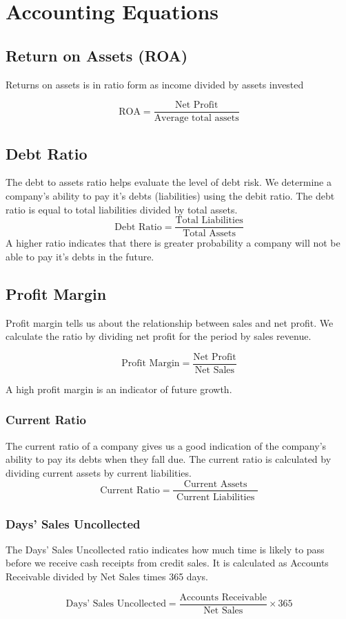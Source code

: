 \documentclass[../main.tex]{subfiles}
\begin{document}
	\section{Accounting Equations}
	
	\subsection{Return on Assets (ROA)}
	
	Returns on assets is in ratio form as income divided by assets invested \ie 
	
	\[
	\text{ROA} = \frac{\text{Net Profit}}{\text{Average total assets}}
	\]
	
	\subsection{Debt Ratio}
	
	The debt to assets ratio helps evaluate the level of debt risk. We 
	determine a company’s ability to pay it’s debts (liabilities) using the 
	debit ratio. The debt ratio is equal to total liabilities divided by total 
	assets.  
	\[
	\text{Debt Ratio} = \frac{\text{Total Liabilities}}{\text{Total Assets}}
	\]
	A higher ratio indicates that there is greater probability a 
	company will not be able to pay it’s debts in the future.
	
	\subsection{Profit Margin}
	
	Profit margin tells us about the relationship between sales and net 
	profit. We calculate the ratio by dividing net profit for the period by 
	sales revenue.
	
	\[
	\text{Profit Margin} = \frac{\text{Net Profit}}{\text{Net Sales}}
	\]
	
	A high profit margin is an indicator of future growth.
	
	\subsubsection{Current Ratio}
	
	The current ratio of a company gives us a good indication of the company’s 
	ability to pay its debts when they fall due. The current ratio is 
	calculated by dividing current assets by current liabilities. 
	\[
	\text{Current Ratio} = \frac{\text { Current Assets }}{\text { Current 
	Liabilities }}
	\]
	
	\subsubsection{Days' Sales Uncollected}
	
	The Days’ Sales Uncollected ratio indicates how much time is likely to pass before we receive cash 
	receipts from credit sales. It is calculated as Accounts Receivable divided by Net Sales times 365 
	days.
	
	\[
	\text{Days' Sales Uncollected} = \frac{\text{Accounts Receivable}}{\text{Net Sales}} \times 365
	\]
\end{document}
